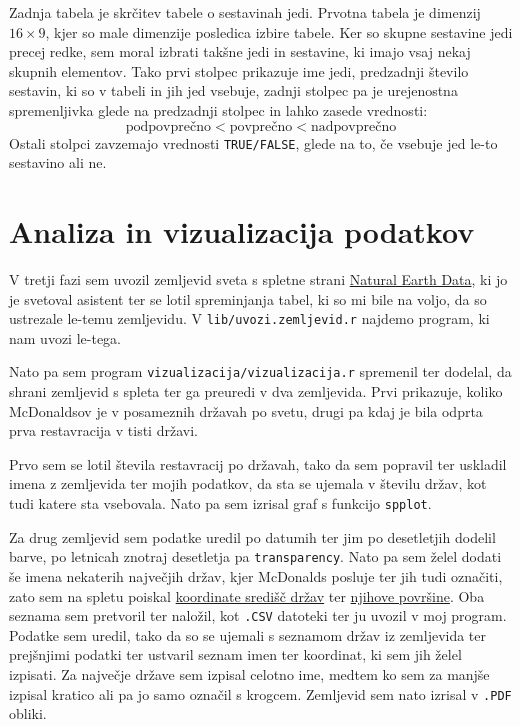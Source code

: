 \documentclass[11pt,a4paper]{article}
\begin{document}
Zadnja tabela je skrčitev tabele o sestavinah jedi. Prvotna tabela je dimenzij $16 \times 9$, kjer so male dimenzije posledica izbire tabele. Ker so skupne sestavine jedi precej redke, sem moral izbrati takšne jedi in sestavine, ki imajo vsaj nekaj skupnih elementov. Tako prvi stolpec prikazuje ime jedi, predzadnji število sestavin, ki so v tabeli in jih jed vsebuje, zadnji stolpec pa je urejenostna spremenljivka glede na predzadnji stolpec in lahko zasede vrednosti: $$\mbox{podpovprečno} < \mbox{povprečno} < \mbox{nadpovprečno}$$
Ostali stolpci zavzemajo vrednosti \verb|TRUE/FALSE|, glede na to, če vsebuje jed le-to sestavino ali ne.

\newpage

\section{Analiza in vizualizacija podatkov}


V tretji fazi sem uvozil zemljevid sveta s spletne strani \href{http://www.naturalearthdata.com/http//www.naturalearthdata.com/download/50m/cultural/ne_50m_admin_0_countries.zip}{Natural Earth Data}, ki jo je svetoval asistent ter se lotil spreminjanja tabel, ki so mi bile na voljo, da so ustrezale le-temu zemljevidu. V \verb|lib/uvozi.zemljevid.r| najdemo program, ki nam uvozi le-tega. \par

Nato pa sem program \verb|vizualizacija/vizualizacija.r| spremenil ter dodelal, da shrani zemljevid s spleta ter ga preuredi v dva zemljevida. Prvi prikazuje, koliko McDonaldsov je v posameznih državah po svetu, drugi pa kdaj je bila odprta prva restavracija v tisti državi.

Prvo sem se lotil števila restavracij po državah, tako da sem popravil ter uskladil imena z zemljevida ter mojih podatkov, da sta se ujemala v številu držav, kot tudi katere sta vsebovala. Nato pa sem izrisal graf s funkcijo \verb|spplot|. \par

Za drug zemljevid sem podatke uredil po datumih ter jim po desetletjih dodelil barve, po letnicah znotraj desetletja pa \verb|transparency|. Nato pa sem želel dodati še imena nekaterih največjih držav, kjer McDonalds posluje ter jih tudi označiti, zato sem na spletu poiskal \href{https://developers.google.com/public-data/docs/canonical/countries_csv}{koordinate središč držav} ter \href{http://simple.wikipedia.org/wiki/List_of_countries_by_area}{njihove površine}. Oba seznama sem pretvoril ter naložil, kot \verb|.CSV| datoteki ter ju uvozil v moj program. Podatke sem uredil, tako da so se ujemali s seznamom držav iz zemljevida ter prejšnjimi podatki ter ustvaril seznam imen ter koordinat, ki sem jih želel izpisati. Za največje države sem izpisal celotno ime, medtem ko sem za manjše izpisal kratico ali pa jo samo označil s krogcem. Zemljevid sem nato izrisal v \verb|.PDF| obliki. \par
\end{document}
